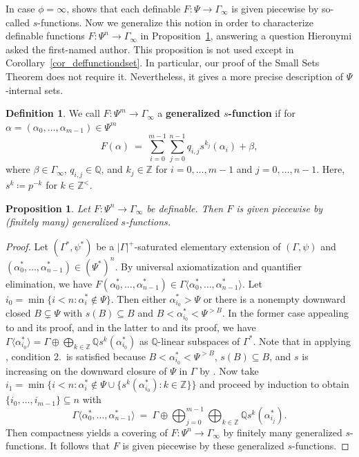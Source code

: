 \documentclass[11pt]{amsart}
\theoremstyle{plain}
\newtheorem{prop}[thm]{Proposition}
\theoremstyle{definition}
\newtheorem*{def*}{Definition}
\numberwithin{equation}{section}
\newcommand\Q{\mathbb{Q}}
\newcommand\Z{\mathbb{Z}}
\newcommand\0{\varnothing}
\begin{document}
\noindent
In case $\phi=\infty$, \cite[Theorem~6.3]{GehretACTlog} shows that each definable $F \colon \Psi \to \Gamma_{\infty}$ is given piecewise by so-called $s$-functions.
Now we generalize this notion in order to characterize definable functions $F \colon \Psi^n \to \Gamma_{\infty}$ in Proposition~\ref{characterization_of_functions_from_Psin}, answering a question Hieronymi asked the first-named author.
This proposition is not used except in Corollary~\ref{cor_deffunctiondset}. In particular, our proof of the Small Sets Theorem does not require it. Nevertheless, it gives a more precise description of $\Psi$-internal sets.

\begin{def*}
We call $F \colon \Psi^m \to \Gamma_{\infty}$ a \textbf{generalized $s$-function} if for $\alpha=(\alpha_0,\dots,\alpha_{m-1})\in \Psi^m$
\[
F(\alpha)\ = \ \sum_{i=0}^{m-1} \sum_{j=0}^{n-1} q_{i,j}s^{k_j}(\alpha_i) + \beta,
\]
where $\beta \in \Gamma_{\infty}$, $q_{i,j}\in \Q$, and $k_j\in \Z$ for $i=0,\dots,m-1$ and $j=0,\dots,n-1$.
Here, $s^{k}\coloneqq p^{-k}$ for $k \in \Z^{<}$.
\end{def*}

\begin{prop}\label{characterization_of_functions_from_Psin}
Let $F \colon \Psi^n \to \Gamma_{\infty}$ be definable.
Then $F$ is given piecewise by (finitely many) generalized $s$-functions.
\end{prop}
\begin{proof}
Let $(\Gamma^*, \psi^*)$ be a $|\Gamma|^+$-saturated elementary extension of $(\Gamma,\psi)$ and $(\alpha_0^*, \dots, \alpha_{n-1}^*) \in (\Psi^*)^n$.
By universal axiomatization and quantifier elimination, we have $F(\alpha_0^*,\dots,\alpha_{n-1}^*) \in \Gamma\langle \alpha_0^*,\dots,\alpha_{n-1}^*\rangle$.
Let $i_0=\min\{i<n : \alpha_i^*\notin\Psi\}$.
Then either $\alpha_{i_0}^*>\Psi$ or there is a nonempty downward closed $B\subsetneq\Psi$ with $s(B)\subseteq B$ and $B<\alpha_{i_0}^*<\Psi^{>B}$.
In the former case appealing to \cite[Lemma~4.11]{GehretACTlog} and its proof, and in the latter to \cite[Lemma~4.12]{GehretACTlog} and its proof, we have $\Gamma\langle \alpha_{i_0}^*\rangle = \Gamma\oplus\bigoplus_{k\in\Z} \Q s^k(\alpha_{i_0}^*)$ as $\Q$-linear subspaces of $\Gamma^*$.
Note that in applying \cite[Lemma~4.12]{GehretACTlog}, condition 2.\ is satisfied because $B<\alpha_{i_0}^*<\Psi^{>B}$, $s(B)\subseteq B$, and $s$ is increasing on the downward closure of $\Psi$ in $\Gamma$ by \cite[Corollary~3.6]{GehretACTlog}.
Now take $i_1 = \min\{i<n: \alpha_{i}^* \notin \Psi \cup \{s^k(\alpha_{i_0}^*) : k \in \Z\} \}$ and proceed by induction to obtain $\{i_0,\dots,i_{m-1}\}\subseteq n$ with
\[
\Gamma\langle \alpha_0^*, \dots, \alpha_{n-1}^*\rangle\ =\ \Gamma\oplus\bigoplus_{j=0}^{m-1}\bigoplus_{k\in\Z} \Q s^k(\alpha_{i_j}^*).
\]
Then compactness yields a covering of $F \colon \Psi^n \to \Gamma_{\infty}$ by finitely many generalized $s$-functions.
It follows that $F$ is given piecewise by these generalized $s$-functions. \end{proof}
\end{document}
